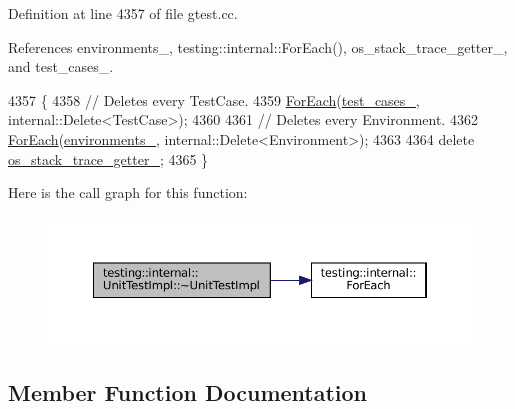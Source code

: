 Definition at line 4357 of file gtest.\+cc.



References environments\+\_\+, testing\+::internal\+::\+For\+Each(), os\+\_\+stack\+\_\+trace\+\_\+getter\+\_\+, and test\+\_\+cases\+\_\+.


\begin{DoxyCode}
4357                             \{
4358   \textcolor{comment}{// Deletes every TestCase.}
4359   \hyperlink{namespacetesting_1_1internal_a52f5504ed65d116201ccb8f99a44fd7e}{ForEach}(\hyperlink{classtesting_1_1internal_1_1UnitTestImpl_a79ec0f733ada2898efd1a7fbd8587fb3}{test\_cases\_}, internal::Delete<TestCase>);
4360 
4361   \textcolor{comment}{// Deletes every Environment.}
4362   \hyperlink{namespacetesting_1_1internal_a52f5504ed65d116201ccb8f99a44fd7e}{ForEach}(\hyperlink{classtesting_1_1internal_1_1UnitTestImpl_a1d2320ba1e4e1cad8d624bbb222501fb}{environments\_}, internal::Delete<Environment>);
4363 
4364   \textcolor{keyword}{delete} \hyperlink{classtesting_1_1internal_1_1UnitTestImpl_a16b34d9194ca9552f581e472e9b18494}{os\_stack\_trace\_getter\_};
4365 \}
\end{DoxyCode}
Here is the call graph for this function\+:
\nopagebreak
\begin{figure}[H]
\begin{center}
\leavevmode
\includegraphics[width=350pt]{classtesting_1_1internal_1_1UnitTestImpl_ae8bfe40adf9772237ea51299af113575_cgraph}
\end{center}
\end{figure}


\subsection{Member Function Documentation}
\mbox{\label{classtesting_1_1internal_1_1UnitTestImpl_a8be26dc90e0fac8f8be3552ffd98c69c}} 
